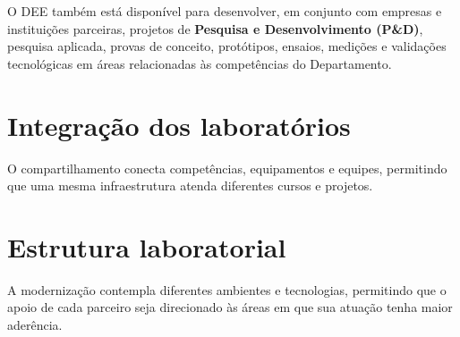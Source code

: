 \documentclass[12pt,a4paper]{article}
\begin{document}
O DEE também está disponível para desenvolver, em conjunto com empresas e instituições parceiras, projetos de \textbf{Pesquisa e Desenvolvimento (P\&D)}, pesquisa aplicada, provas de conceito, protótipos, ensaios, medições e validações tecnológicas em áreas relacionadas às competências do Departamento.

\section{Integração dos laboratórios}\label{sec:integracao}


O compartilhamento conecta competências, equipamentos e equipes, permitindo que uma mesma infraestrutura atenda diferentes cursos e projetos.

\clearpage
\section{Estrutura laboratorial}\label{sec:estrutura}
A modernização contempla diferentes ambientes e tecnologias, permitindo que o apoio de cada parceiro seja direcionado às áreas em que sua atuação tenha maior aderência.
\end{document}
